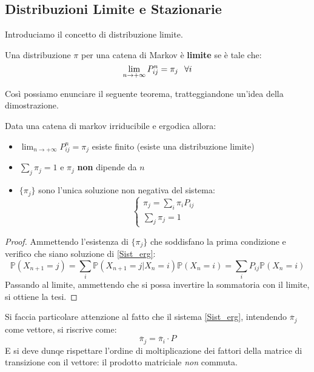 \subsection{Distribuzioni Limite e Stazionarie}
Introduciamo il concetto di distribuzione limite. 
\begin{definition}
Una distribuzione $\pi$ per una catena di Markov è \textbf{limite} se è tale che:
\[\lim_{n\to+\infty}P_{ij}^n=\pi_j \hspace{7px} \forall i\]
\end{definition}
\vspace{5px}
Così possiamo enunciare il seguente teorema, tratteggiandone un'idea della dimostrazione.
\begin{theorem} \label{Teor_erg}
Data una catena di markov irriducibile e ergodica allora:
\begin{itemize}
    \item $\lim_{n\to+\infty}P_{ij}^n=\pi_j$ esiste finito (esiste una distribuzione limite)
    \item $\sum_j\pi_j=1$ e $\pi_j$ \textbf{non} dipende da $n$
    \item $\{\pi_j\}$ sono l'unica soluzione non negativa del sistema: \begin{equation} \label{Sist_erg}
    \begin{cases}
    \pi_j=\sum_i\pi_iP_{ij}
    \\ \sum_j\pi_j=1
    \end{cases}
    \end{equation}
\end{itemize}
\begin{proof}
Ammettendo l'esistenza di $\{\pi_j\}$ che soddisfano la prima condizione e verifico che siano soluzione di \ref{Sist_erg}:
\[\mathbb{P}(X_{n+1}=j)=\sum_i\mathbb{P}(X_{n+1}=j|X_n=i)\mathbb{P}(X_n=i)=\sum_iP_{ij}\mathbb{P}(X_n=i)\]
Passando al limite, ammettendo che si possa invertire la sommatoria con il limite, si ottiene la tesi.
\end{proof}
\end{theorem}

Si faccia particolare attenzione al fatto che il sistema \ref{Sist_erg}, intendendo $\overline{\pi}_j$ come vettore, si riscrive come:
\[\overline{\pi}_j=\overline{\pi}_i\cdot P\]
E si deve dunqe rispettare l'ordine di moltiplicazione dei fattori della matrice di transizione con il vettore: il prodotto matriciale \textit{non} commuta.

